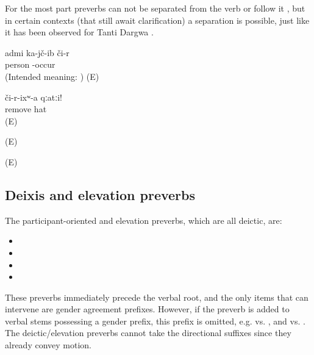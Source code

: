 For the most part preverbs can not be separated from the verb or follow it , but in certain contexts (that still await clarification) a separation is possible, just like it has been observed for Tanti Dargwa \citep[107]{Sumbatova.Lander2014} .
%
\begin{exe}
	\ex	\label{ex:The man fell down ungrammatical verbs}
	\gll	{*}	admi	ka-jč-ib či-r\\
		{}	person	-occur	\\
	\glt	(Intended meaning: ) (E)

	\ex	\label{ex:Take off the hat verbs}
	\begin{xlist}
		\ex	\label{ex:Take off the hat verbs@A}
		\gll	či-r-ixʷ-a	qːatːi!\\
			remove	hat\\
		\glt	{} (E)

		\ex	{}	\label{ex:Take off the hat verbs@B}
		\glt	{} (E)

		\ex	{}	\label{ex:Take off the hat verbs@C}
		\glt	{} (E)
	\end{xlist}
\end{exe}



\subsection{Deixis and elevation preverbs}
\label{ssec:Deixis/gravitation preverbs}

The participant-oriented and elevation preverbs, which are all deictic, are:
%
\begin{itemize}
	\item	{} 
	\item	{} 
	\item	{} 
	\item	{} 
\end{itemize}

These preverbs immediately precede the verbal root, and the only items that can intervene are gender agreement prefixes. However, if the preverb  is added to verbal stems possessing a gender prefix, this prefix is omitted, e.g.   vs.  , and   vs.  . The deictic/elevation preverbs cannot take the directional suffixes since they already convey motion.

